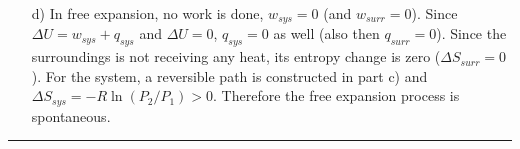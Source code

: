 \begin{itemize}
\item[d)] In free expansion, no work is done, $w_{sys} = 0$ (and $w_{surr} = 0$). Since $\Delta U = w_{sys} + q_{sys}$ and $\Delta U = 0$, $q_{sys} = 0$ as well (also then $q_{surr} = 0$). Since the surroundings is not receiving any heat, its entropy change is zero ($\Delta S_{surr} = 0$). For the system, a reversible path is constructed in part c) and $\Delta S_{sys} = -R\ln\left(P_2/P_1\right) > 0$. Therefore the free expansion process is spontaneous.
\end{itemize}

\hrule\vspace{0.5cm}
